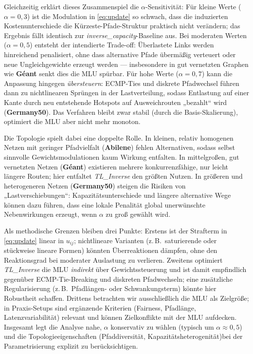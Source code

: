 \documentclass[sigconf,nonacm,review]{acmart}
\begin{document}
Gleichzeitig erklärt dieses Zusammenspiel die \(\alpha\)-Sensitivität: Für kleine Werte
(\(\alpha=0{,}3\)) ist die Modulation in \eqref{eq:update} so schwach, dass die induzierten Kostenunterschiede die Kürzeste-Pfade-Struktur praktisch nicht verändern; das Ergebnis fällt identisch zur \emph{inverse\_capacity}-Baseline aus. Bei moderaten Werten (\(\alpha=0{,}5\)) entsteht der intendierte Trade-off: Überlastete Links werden hinreichend penalisiert, ohne dass alternative Pfade übermäßig verteuert oder neue Ungleichgewichte erzeugt werden — insbesondere in gut vernetzten Graphen wie \textbf{Géant} senkt dies die MLU spürbar. Für hohe Werte (\(\alpha=0{,}7\)) kann die Anpassung hingegen \emph{übersteuern}: ECMP-Ties und diskrete Pfadwechsel führen dann zu nichtlinearen Sprüngen in der Lastverteilung, sodass Entlastung auf einer Kante durch neu entstehende Hotspots auf Ausweichrouten „bezahlt“ wird (\textbf{Germany50}). Das Verfahren bleibt zwar stabil (durch die Basis-Skalierung), optimiert die MLU aber nicht mehr monoton.

Die Topologie spielt dabei eine doppelte Rolle. In kleinen, relativ homogenen Netzen mit geringer Pfadvielfalt (\textbf{Abilene}) fehlen Alternativen, sodass selbst sinnvolle Gewichtsmodulationen kaum Wirkung entfalten. In mittelgroßen, gut vernetzten Netzen (\textbf{Géant}) existieren mehrere konkurrenzfähige, nur leicht längere Routen; hier entfaltet \textit{TL\_Inverse} den größten Nutzen. In größeren und heterogeneren Netzen (\textbf{Germany50}) steigen die Risiken von „Lastverschiebungen“: Kapazitätsunterschiede und längere alternative Wege können dazu führen, dass eine lokale Penalität global unerwünschte Nebenwirkungen erzeugt, wenn \(\alpha\) zu groß gewählt wird.

Als methodische Grenzen bleiben drei Punkte: Erstens ist der Strafterm in \eqref{eq:update} linear in $u_{ij}$; nichtlineare Varianten (z.\,B.\ saturierende oder stückweise lineare Formen) könnten Überreaktionen dämpfen, ohne den Reaktionsgrad bei moderater Auslastung zu verlieren. Zweitens optimiert \textit{TL\_Inverse} die MLU \emph{indirekt} über Gewichtssteuerung und ist damit empfindlich gegenüber ECMP-Tie-Breaking und diskreten Pfadwechseln; eine zusätzliche Regularisierung (z.\,B.\ Pfadlängen- oder Schwankungsterm) könnte hier Robustheit schaffen. Drittens betrachten wir ausschließlich die MLU als Zielgröße; in Praxis-Setups sind ergänzende Kriterien (Fairness, Pfadlänge, Latenzvariabilität) relevant und können Zielkonflikte mit der MLU aufdecken. Insgesamt legt die Analyse nahe, \(\alpha\) konservativ zu wählen (typisch um \(\alpha\approx0{,}5\)) und die Topologieeigenschaften (Pfaddiversität, Kapazitätsheterogenität)bei der Parametrisierung explizit zu berücksichtigen.
\end{document}
